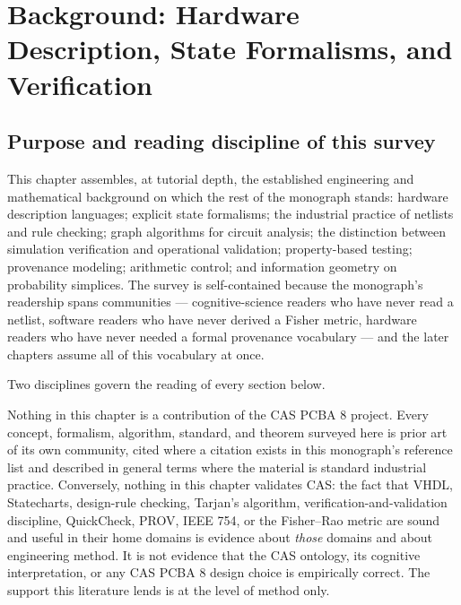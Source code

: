 \chapter{Background: Hardware Description, State Formalisms, and Verification}\label{ch02:background}

\section{Purpose and reading discipline of this survey}\label{ch02:purpose}

This chapter assembles, at tutorial depth, the established engineering and
mathematical background on which the rest of the monograph stands: hardware
description languages; explicit state formalisms; the industrial practice of
netlists and rule checking; graph algorithms for circuit analysis; the
distinction between simulation verification and operational validation;
property-based testing; provenance modeling; arithmetic control; and
information geometry on probability simplices. The survey is self-contained
because the monograph's readership spans communities --- cognitive-science
readers who have never read a netlist, software readers who have never
derived a Fisher metric, hardware readers who have never needed a formal
provenance vocabulary --- and the later chapters assume all of this
vocabulary at once.

Two disciplines govern the reading of every section below.

\begin{boundary}\label{ch02:bnd:background}
Nothing in this chapter is a contribution of the CAS PCBA 8 project. Every
concept, formalism, algorithm, standard, and theorem surveyed here is prior
art of its own community, cited where a citation exists in this monograph's
reference list and described in general terms where the material is
standard industrial practice. Conversely, nothing in this chapter validates
CAS: the fact that VHDL, Statecharts, design-rule checking, Tarjan's
algorithm, verification-and-validation discipline, QuickCheck, PROV, IEEE
754, or the Fisher--Rao metric are sound and useful in their home domains
is evidence about \emph{those} domains and about engineering method. It is
not evidence that the CAS ontology, its cognitive interpretation, or any
CAS PCBA 8 design choice is empirically correct. The support this
literature lends is at the level of method only.
\end{boundary}

